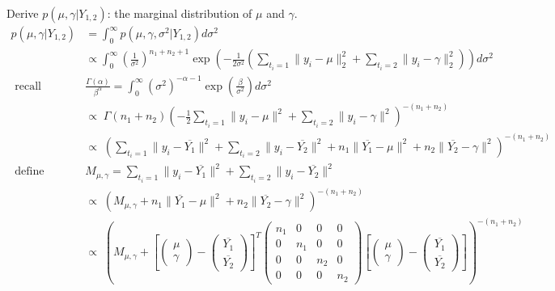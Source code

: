 \documentclass[12pt,letterpaper,twoside]{article}
\begin{document}
\begin{enumerate}[label=(\alph*)]
    Derive $p(\mu, \gamma|Y_{1,2})$: the marginal distribution of $\mu$ and $\gamma$.
    \begin{align*}
        p(\mu, \gamma|Y_{1,2}) & = \int_0^{\infty} p(\mu, \gamma, \sigma^2|Y_{1,2}) d\sigma^2 \\
            & \propto \int_0^{\infty} \left(\frac{1}{\sigma^2}\right)^{n_1+n_2+1} \exp\left(-\frac{1}{2\sigma^2}(\sum_{t_i=1} \|y_i-\mu\|^2_2 + \sum_{t_i=2} \|y_i-\gamma\|^2_2)\right) d\sigma^2 \\
        \textrm{ recall  }\quad& \frac{\Gamma(\alpha)}{\beta^\alpha} = \int_0^\infty (\sigma^2)^{-\alpha - 1} \exp\left(\frac{\beta}{\sigma^2}\right)d\sigma^2\\
            & \propto \; \Gamma(n_1 + n_2) \left(-\frac{1}{2}  \sum_{t_i=1} \lVert y_i - \mu\rVert^2 + \sum_{t_i=2}\lVert y_i - \gamma \rVert^2\right)^{-(n_1 + n_2)} \\
            & \propto \; (\sum_{t_i=1}\lVert y_i - \overline{Y_1} \rVert^2 + \sum_{t_i=2}\lVert y_i - \overline{Y_2} \rVert^2 + n_1\lVert \overline{Y_1} - \mu \rVert^2 + n_2\lVert \overline{Y_2} - \gamma \rVert^2)^{-(n_1 + n_2)}\\
        \textrm{ define  }\quad& M_{\mu, \gamma} = \sum_{t_i=1}\lVert y_i - \overline{Y_1} \rVert^2 + \sum_{t_i=2}\lVert y_i - \overline{Y_2} \rVert^2\\
            & \propto \; (M_{\mu, \gamma} + n_1\lVert \overline{Y_1} - \mu \rVert^2 + n_2\lVert \overline{Y_2} - \gamma \rVert^2)^{-(n_1 + n_2)}\\
            & \propto \; \left(M_{\mu, \gamma} + \left[\left(\begin{matrix}\mu\\ \gamma\end{matrix}\right) - \left(\begin{matrix*}\overline{Y_1}\\ \overline{Y_2}\end{matrix*}\right)\right]^T \left(\begin{matrix*} n_1 & 0 & 0 & 0 \\ 0 & n_1 & 0 & 0 \\ 0 & 0 & n_2 & 0 \\ 0 & 0 & 0 & n_2 \end{matrix*}\right) \left[\left(\begin{matrix}\mu\\ \gamma\end{matrix}\right) - \left(\begin{matrix*}\overline{Y_1}\\ \overline{Y_2}\end{matrix*}\right)\right]\right)^{-(n_1 + n_2)}\\

\end{align*}
\end{enumerate}
\end{document}
